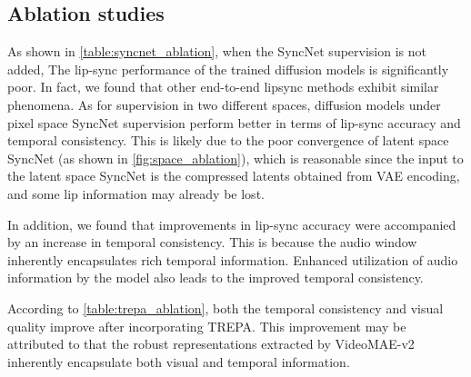 \subsection{Ablation studies}
\label{sec:ablation}
As shown in \cref{table:syncnet_ablation}, when the SyncNet supervision is not added, The lip-sync performance of the trained diffusion models is significantly poor. In fact, we found that other end-to-end lipsync methods \cite{prajwal2020lip,mukhopadhyay2024diff2lip} exhibit similar phenomena. As for supervision in two different spaces, diffusion models under pixel space SyncNet supervision perform better in terms of lip-sync accuracy and temporal consistency. This is likely due to the poor convergence of latent space SyncNet (as shown in \cref{fig:space_ablation}), which is reasonable since the input to the latent space SyncNet is the compressed latents obtained from VAE encoding, and some lip information may already be lost.

In addition, we found that improvements in lip-sync accuracy were accompanied by an increase in temporal consistency. This is because the audio window inherently encapsulates rich temporal information. Enhanced utilization of audio information by the model also leads to the improved temporal consistency.

According to \cref{table:trepa_ablation}, both the temporal consistency and visual quality improve after incorporating TREPA. This improvement may be attributed to that the robust representations extracted by VideoMAE-v2 \cite{wang2023videomae} inherently encapsulate both visual and temporal information.

\begin{table}[t]
    \centering
    \caption{The ablation studies of TREPA. HDTF results.}
    \vspace{-10pt}
    \label{table:trepa_ablation}
\end{table}

